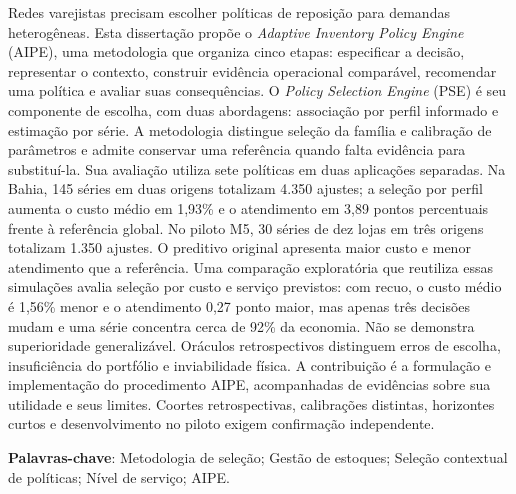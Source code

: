 Redes varejistas precisam escolher políticas de reposição para demandas heterogêneas. Esta dissertação propõe o \textit{Adaptive Inventory Policy Engine} (AIPE), uma metodologia que organiza cinco etapas: especificar a decisão, representar o contexto, construir evidência operacional comparável, recomendar uma política e avaliar suas consequências. O \textit{Policy Selection Engine} (PSE) é seu componente de escolha, com duas abordagens: associação por perfil informado e estimação por série. A metodologia distingue seleção da família e calibração de parâmetros e admite conservar uma referência quando falta evidência para substituí-la. Sua avaliação utiliza sete políticas em duas aplicações separadas. Na Bahia, 145 séries em duas origens totalizam 4.350 ajustes; a seleção por perfil aumenta o custo médio em 1,93\% e o atendimento em 3,89 pontos percentuais frente à referência global. No piloto M5, 30 séries de dez lojas em três origens totalizam 1.350 ajustes. O preditivo original apresenta maior custo e menor atendimento que a referência. Uma comparação exploratória que reutiliza essas simulações avalia seleção por custo e serviço previstos: com recuo, o custo médio é 1,56\% menor e o atendimento 0,27 ponto maior, mas apenas três decisões mudam e uma série concentra cerca de 92\% da economia. Não se demonstra superioridade generalizável. Oráculos retrospectivos distinguem erros de escolha, insuficiência do portfólio e inviabilidade física. A contribuição é a formulação e implementação do procedimento AIPE, acompanhadas de evidências sobre sua utilidade e seus limites. Coortes retrospectivas, calibrações distintas, horizontes curtos e desenvolvimento no piloto exigem confirmação independente.

\vspace{2em}
\textbf{Palavras-chave}: Metodologia de seleção; Gestão de estoques; Seleção contextual de políticas; Nível de serviço; AIPE.
